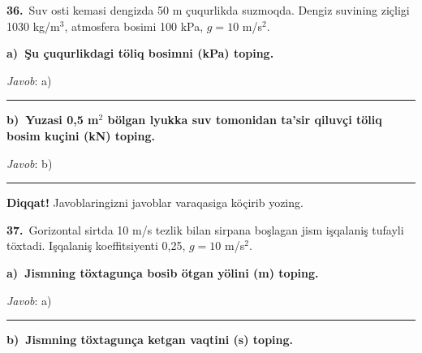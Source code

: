 \documentclass[11pt,a4paper]{article}
\newcommand{\blank}{\rule{5cm}{0.4pt}}
\begin{document}
\noindent{}\par\vspace{14pt}
\noindent\textbf{36.}\ Suv osti kemasi dengizda 50 m çuqurlikda suzmoqda. Dengiz suvining ziçligi 1030 kg/m$^3$, atmosfera bosimi 100 kPa, $g=10$ m/s$^2$.\par\smallskip
\medskip\noindent\textbf{a)\ Şu çuqurlikdagi töliq bosimni (kPa) toping.}\par
\noindent\textit{Javob}: a)\ \blank\par
\medskip\noindent\textbf{b)\ Yuzasi 0,5 m$^2$ bölgan lyukka suv tomonidan ta’sir qiluvçi töliq bosim kuçini (kN) toping.}\par
\noindent\textit{Javob}: b)\ \blank\par
\medskip\noindent\textbf{Diqqat!} Javoblaringizni javoblar varaqasiga köçirib yozing.\par\vspace{10pt}
\noindent\textbf{37.}\ Gorizontal sirtda 10 m/s tezlik bilan sirpana boşlagan jism işqalaniş tufayli töxtadi. Işqalaniş koeffitsiyenti 0,25, $g=10$ m/s$^2$.\par\smallskip
\medskip\noindent\textbf{a)\ Jismning töxtagunça bosib ötgan yölini (m) toping.}\par
\noindent\textit{Javob}: a)\ \blank\par
\medskip\noindent\textbf{b)\ Jismning töxtagunça ketgan vaqtini (s) toping.}\par
\end{document}
